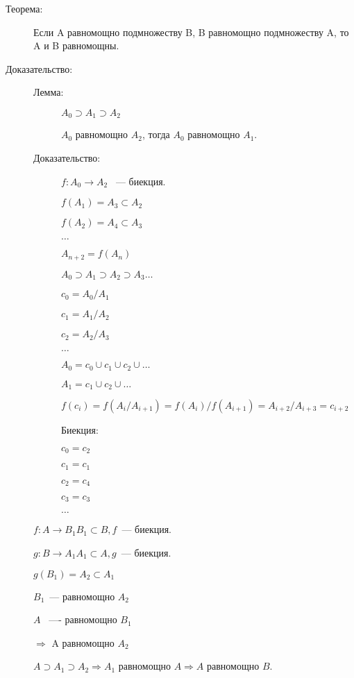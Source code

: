 \documentclass[12pt]{article}
\begin{document}
\begin{description}
\item[Теорема:] Если A равномощно подмножеству B, B равномощно подмножеству A, то A и B равномощны.

\item[Доказательство:]
    \begin{description}
    \item[Лемма:] $A_0 \supset A_1 \supset A_2$ 

    $A_0$ равномощно $A_2$, тогда $A_0$ равномощно $A_1$.

    \item[Доказательство:]
    $f:A_0 \to A_2$ ~--- биекция.

    $f(A_1) = A_3 \subset A_2$

    $f(A_2) = A_4 \subset A_3$

    $\ldots$

    $A_{n + 2} = f(A_n)$

    $A_0 \supset A_1 \supset A_2 \supset A_3 \ldots$

    $c_0 = A_0/A_1$

    $c_1 = A_1/A_2$

   $c_2 = A_2/A_3$

    $\ldots$

     $A_0 = c_0 \cup c_1 \cup c_2 \cup \ldots$

    $A_1 = c_1 \cup c_2 \cup \ldots$

     $f(c_i) = f(A_i/A_{i + 1}) = f(A_i)/f(A_{i + 1}) = A_{i + 2} / A_{i + 3} = c_{i + 2}$

     Биекция:

    $c_0 = c_2$

    $c_1 = c_1$

    $c_2 = c_4$

    $c_3 = c_3$

    $\ldots$
   \end{description}
  
  $f:A \to B_1  B_1 \subset B, f$~--- биекция.

  $g:B \to A_1  A_1 \subset A, g$~--- биекция.

   $g(B_1) = A_2 \subset A_1$

   $B_1 $~--- равномощно $A_2$

    $A $ ~---- равномощно $B_1$ 

    $\Rightarrow$ A равномощно $A_2$

    $A \supset A_1 \supset A_2 \Rightarrow A_1$ равномощно $A \Rightarrow A$ равномощно $B$.  

\end{description}
\end{document}
